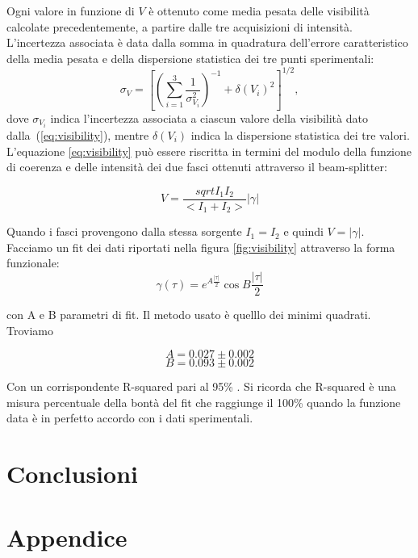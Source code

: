 \documentclass[10pt,oneside,a4paper]{article}
\newenvironment{Figure}
  {\par\medskip\noindent\minipage{\linewidth}}
  {\endminipage\par\medskip}
\begin{document}
\begin{multicols}{2}
Ogni valore in funzione di $V$ è ottenuto come media pesata delle visibilità calcolate precedentemente, a partire dalle tre acquisizioni di intensità. L'incertezza associata è data dalla somma in quadratura dell'errore caratteristico della media pesata e della dispersione statistica dei tre punti sperimentali:
\[
\sigma_V = \left[ \left( \sum_{i=1}^3 \frac{1}{\sigma_\text{$V_i$}^2}\right)^{-1} + \delta(V_i)^2 \right]^{1/2}, 
\]
dove $\sigma_\text{$V_i$}$ indica l'incertezza associata a ciascun valore della visibilità dato dalla~(\ref{eq:visibility}), mentre $\delta(V_i)$ indica la dispersione statistica dei tre valori.
L'equazione \ref{eq:visibility} può essere riscritta in termini del modulo della funzione di coerenza e delle intensità dei due fasci ottenuti attraverso il beam-splitter:

\begin{equation}\label{eq:visibility2}
V = \frac{sqrt{I_1 I_2}}{<I_1 + I_2>}|\gamma|
\end{equation}

Quando i fasci provengono dalla stessa sorgente $I_1=I_2$ e quindi $V = |\gamma|$. Facciamo un fit dei dati riportati nella figura \ref{fig:visibility} attraverso la forma funzionale:
$$\gamma(\tau) = e^{A\frac{|\tau|}{2}}\cos{B\frac{|\tau|}{2}}$$

con A e B parametri di fit. Il metodo usato è quelllo dei minimi quadrati. Troviamo

$$A = 0.027 \pm 0.002$$
$$B = 0.093 \pm 0.002$$

Con un corrispondente R-squared pari al 95\% . Si ricorda che R-squared è una misura percentuale della bontà del fit che raggiunge il 100\% quando la funzione data è in perfetto accordo con i dati sperimentali.






\section{Conclusioni}


\end{multicols}

\section{Appendice}

\end{document}
